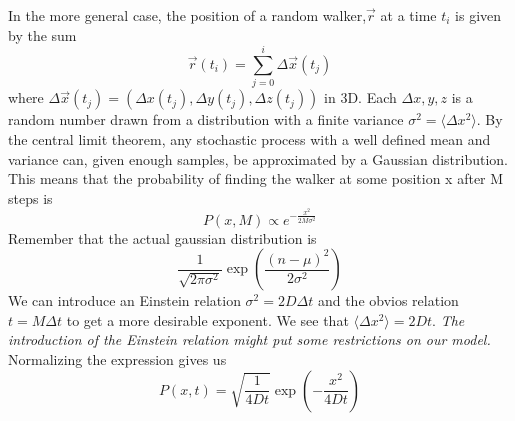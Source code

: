 In the more general case, the position of a random walker,$\vec{r}$ at a time $t_i$ is given by the sum
\begin{equation}\label{brownian_motion}
 \vec{r}(t_i)=\sum\limits_{j=0}^i \Delta \vec{x}(t_j)
\end{equation}
where $\Delta \vec{x}(t_j) = \left(\Delta x(t_j),\Delta y(t_j),\Delta z(t_j)\right)$ in 3D. Each $\Delta x,y,z$ is a random number drawn from a distribution with a finite variance $\sigma^2 = \langle\Delta x^2\rangle$. 
By the central limit theorem, any stochastic process with a well defined mean and variance can, given enough samples, be approximated by a Gaussian distribution. 
This means that the probability of finding the walker at some position x after M steps is 
\begin{equation}
 P(x,M)\propto e^{-\frac{x^2}{2M\sigma^2}}
\end{equation}
Remember that the actual gaussian distribution is 
$$
\frac{1}{\sqrt{2\pi\sigma^2}}\exp\left(\frac{(n-\mu)^2}{2\sigma^2}\right)
$$
We can introduce an Einstein relation $\sigma^2 = 2D\Delta t$ and the obvios relation $t = M\Delta t$ to get a more desirable exponent.
We see that $\langle \Delta x^2\rangle = 2Dt$. 
\emph{The introduction of the Einstein relation might put some restrictions on our model.}
Normalizing the expression gives us 
\begin{equation}\label{rw_gaussian_distribution}
 P(x,t) = \sqrt{\frac{1}{4Dt}}\exp\left(-\frac{x^2}{4Dt}\right)
\end{equation}

